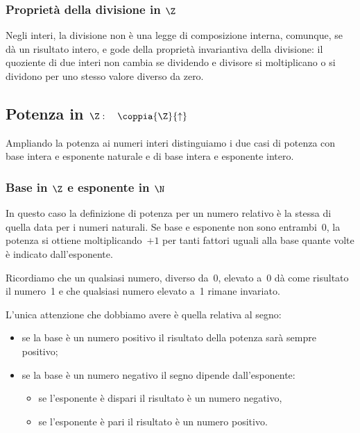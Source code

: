 \subsubsection{Proprietà della divisione in \(\Z\)}

Negli interi, la divisione non è una legge di composizione interna, 
comunque, se dà un risultato intero, e gode della proprietà invariantiva 
della divisione: 
il quoziente di due interi non cambia se dividendo e divisore si 
moltiplicano o si dividono per uno stesso valore diverso da zero.



\subsection{Potenza in $\Z: \quad \coppia{\Z}{\uparrow}$}

Ampliando la potenza ai numeri interi distinguiamo i due casi di potenza con 
base intera e esponente naturale e di base intera e esponente intero. 

\subsubsection{Base in \(\Z\) e esponente in \(\N\)}

In questo caso la definizione di potenza per un numero relativo è la stessa 
di quella data per i numeri naturali.
Se base e esponente non sono entrambi~0, la potenza si ottiene 
moltiplicando~\(+1\) per tanti fattori uguali alla base quante volte è 
indicato dall'esponente.

Ricordiamo che un qualsiasi numero, diverso da~0, elevato a~0 dà come 
risultato il numero~1 e che qualsiasi numero elevato a~1 rimane invariato.

L'unica attenzione che dobbiamo avere è quella relativa al segno:
\begin{itemize} [nosep]
\item se la base è un numero positivo il risultato della potenza sarà 
sempre positivo;
\item se la base è un numero negativo il segno dipende dall'esponente: 
\begin{itemize} [nosep]
\item se l'esponente è dispari il risultato è un numero negativo,
\item se l'esponente è pari il risultato è un numero positivo.
\end{itemize}
\end{itemize}

